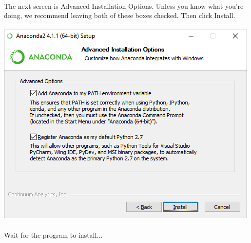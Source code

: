 \documentclass[]{article}
\begin{document}
\paragraph{}

\paragraph{}
The next screen is Advanced Installation Options. Unless you know what you're doing, we recommend leaving both of these boxes checked. Then click Install.
\paragraph{}
\begin{centering}
    \centerline{\includegraphics[scale=0.7]{Screenshot_9.png}}
\end{centering}

\paragraph{}
Wait for the program to install...
\end{document}
